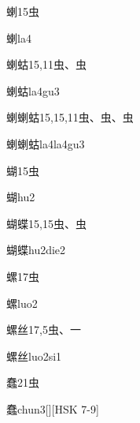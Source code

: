 \begin{Entry}{蝲}{15}{⾍}
  \begin{Phonetics}{蝲}{la4}
  \end{Phonetics}
\end{Entry}

\begin{Entry}{蝲蛄}{15,11}{⾍、⾍}
  \begin{Phonetics}{蝲蛄}{la4gu3}
  \end{Phonetics}
\end{Entry}

\begin{Entry}{蝲蝲蛄}{15,15,11}{⾍、⾍、⾍}
  \begin{Phonetics}{蝲蝲蛄}{la4la4gu3}
  \end{Phonetics}
\end{Entry}

\begin{Entry}{蝴}{15}{⾍}
  \begin{Phonetics}{蝴}{hu2}
  \end{Phonetics}
\end{Entry}

\begin{Entry}{蝴蝶}{15,15}{⾍、⾍}
  \begin{Phonetics}{蝴蝶}{hu2die2}
  \end{Phonetics}
\end{Entry}

\begin{Entry}{螺}{17}{⾍}
  \begin{Phonetics}{螺}{luo2}
  \end{Phonetics}
\end{Entry}

\begin{Entry}{螺丝}{17,5}{⾍、⼀}
  \begin{Phonetics}{螺丝}{luo2si1}
  \end{Phonetics}
\end{Entry}

\begin{Entry}{蠢}{21}{⾍}
  \begin{Phonetics}{蠢}{chun3}[][HSK 7-9]
  \end{Phonetics}
\end{Entry}


